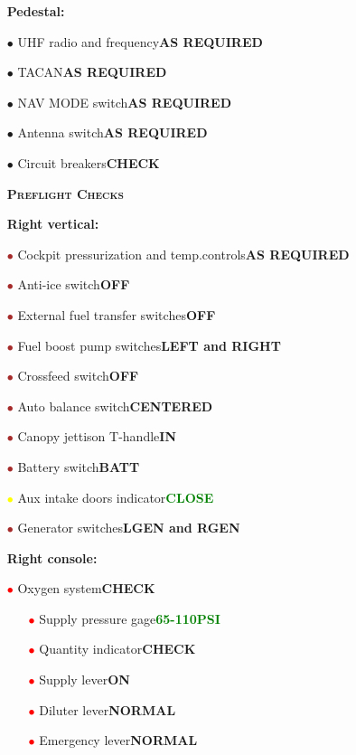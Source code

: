 \documentclass[a4paper,12pt,dvipsnames]{letter}
\newcommand{\button}[1]{\textbf{#1}}
\newcommand{\ok}[1]{\textcolor{Green}{\textbf{#1}}}
\newcommand{\myHead}[1]{{\LARGE\textsc{\textbf{#1}}}}
\newcommand{\ri}{\textcolor{Red}{$\bullet$\;}}
\newcommand{\yi}{\textcolor{Yellow}{$\bullet$\;}}
\newcommand{\ai}{\textcolor{Apricot}{$\bullet$\;}}
\renewcommand{\ni}{\textcolor{Brown}{$\bullet$\;}}
\newcommand{\tb}[1]{\textbf{#1}}
\begin{document}
{\begin{itemize}
 \item[]\tb{Pedestal:}
 \item[\ai] UHF radio and frequency\dotfill\button{AS REQUIRED}
 \item[\ai] TACAN\dotfill\button{AS REQUIRED}
 \item[\ai] NAV MODE switch\dotfill\button{AS REQUIRED}
 \item[\ai] Antenna switch\dotfill\button{AS REQUIRED}
 \item[\ai] Circuit breakers\dotfill\button{CHECK}
\end{itemize}
\newpage
\begin{itemize} 
 \item[] \myHead{Preflight Checks}
 \item[]\tb{Right vertical:}
 \item[\ni] Cockpit pressurization and temp.\;controls\dotfill\button{AS REQUIRED}
 \item[\ni] Anti-ice switch\dotfill\button{OFF}
 \item[\ni] External fuel transfer switches\dotfill\button{OFF}
 \item[\ni] Fuel boost pump switches\dotfill\button{LEFT and RIGHT}
 \item[\ni] Crossfeed switch\dotfill\button{OFF}
 \item[\ni] Auto balance switch\dotfill\button{CENTERED}
 \item[\ni] Canopy jettison T-handle\dotfill\button{IN}
 \item[\ni] Battery switch\dotfill\button{BATT}
 \item[\yi] Aux intake doors indicator\dotfill\ok{CLOSE} 
 \item[\ni] Generator switches\dotfill\button{L\;GEN and R\;GEN}
 \item[]\tb{Right console:}
 \item[\ri] Oxygen system\dotfill\button{CHECK}
 \begin{itemize}
  \item[\ri] Supply pressure gage\dotfill\ok{65-110\;PSI}
  \item[\ri] Quantity indicator\dotfill\button{CHECK}
  \item[\ri] Supply lever\dotfill\button{ON}
  \item[\ri] Diluter lever\dotfill\button{NORMAL}
  \item[\ri] Emergency lever\dotfill\button{NORMAL}
 \end{itemize}

\end{itemize}}
\end{document}
